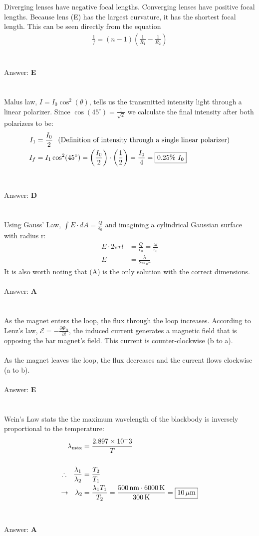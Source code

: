 \documentclass[12pt]{article}
\newcommand{\Answer}[1]{Answer: \textbf{#1}}
\newcommand{\Problem}[3]{
    \setcounter{section}{#1}
    \addtocounter{section}{-1}
    \section{}
    #3\\\\
    \Answer{#2}
}
\begin{document}
\Problem{15}{E}{
Diverging lenses have negative focal lengths. Converging lenses have positive focal lengths. Because lens (E) has the largest curvature, it has the shortest focal length. This can be seen directly from the equation
\begin{align}
\frac{1}{f} = (n-1)\left(\frac{1}{R_{1}}-\frac{1}{R_{2}}\right)
\end{align}
}

\Problem{16}{D}{
Malus law, $I = I_0 \cos^2(\theta)$, tells us the transmitted intensity light through a linear polarizer. Since $\cos(45^{\circ}) = \frac{1}{\sqrt{2}}$ we calculate the final intensity after both polarizers to be:
\begin{align}
I_1 &= \frac{I_0}{2} \hspace{.1in} \text{(Definition of intensity through a single linear polarizer)}\\
I_f &= I_1 \cos^2(45^{\circ}) = \left(\frac{I_0}{2}\right) \cdot \left( \frac{1}{2}\right) = \frac{I_{0}}{4} = \boxed{0.25\% \hspace{.05in} I_{0} }\nonumber
\end{align}
}

\Problem{17}{A}{
Using Gauss' Law, $\int E \cdot dA = \frac{Q}{\epsilon_0}$ and imagining a cylindrical Gaussian surface with radius r:
\begin{align}
E \cdot 2 \pi r l &= \frac{Q}{\epsilon_0} = \frac{\lambda l}{\epsilon_0}\nonumber\\
E &= \boxed{\frac{\lambda}{2 \pi \epsilon_0 r}}\nonumber
\end{align}
It is also worth noting that (A) is the only solution with the correct dimensions.
}

\Problem{18}{E}{
As the magnet enters the loop, the flux through
the loop increases. According to Lenz's law, $\mathcal{E} = -\frac{\partial \Phi_B}{\partial t}$, the induced current generates a magnetic field that is opposing the bar magnet's field. This current is counter-clockwise (b to a).
\\\\
As the magnet leaves the loop, the flux decreases and the current flows clockwise (a to b).
}

\Problem{19}{A}{
Wein's Law stats the the maximum wavelength of the blackbody is inversely proportional to the temperature:
\begin{align}
\lambda_{\max}  &= \frac{2.897\times 10^{-}3}{T}\\
\nonumber\\
\therefore \hspace{.1in} \frac{\lambda_{1}}{\lambda_{2}} &= \frac{T_2}{T_1}\nonumber \\
\rightarrow \hspace{.1in} \lambda_2 &= \frac{\lambda_1T_1}{T_2} =  \frac{500\,\text{nm}\cdot 6000\,\text{K}}{300\,\text{K}} = \boxed{10\,\text{\ensuremath{\mu}m}}\nonumber
\end{align}
}
\end{document}
